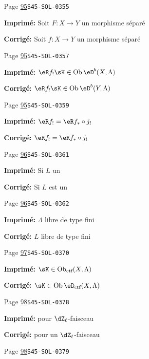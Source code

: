 \documentclass[oneside]{book}
\DeclareMathOperator{\ob}{Ob}
\theoremstyle{sga-source}
\theoremstyle{sga-source-dash}
\theoremstyle{sga-source-dotdash}
\theoremstyle{sga-source-number-note-dash}
\theoremstyle{sga-source-note-number-dotdash}
\theoremstyle{sga-source-example-dotdash}
\theoremstyle{sga-source-inline-number}
\theoremstyle{sga-source-bare-number}
\theoremstyle{sga-source}
\begin{document}
\begin{description}
\smallskip
\item[\hypertarget{apparatus:FR-0047}{47}] Page \hyperlink{printpage:fr:95}{95}\quad\texttt{S45-SOL-0355}
\par\noindent\textbf{Imprimé:} Soit $F:X\to Y$ un morphisme séparé
\par\noindent\textbf{Corrigé:} Soit $f:X\to Y$ un morphisme séparé
\smallskip
\item[\hypertarget{apparatus:FR-0048}{48}] Page \hyperlink{printpage:fr:95}{95}\quad\texttt{S45-SOL-0357}
\par\noindent\textbf{Imprimé:} $\eR f_!\sK\in \ob \eD^b(X,\Lambda)$
\par\noindent\textbf{Corrigé:} $\eR f_!\sK\in \ob \eD^b(Y,\Lambda)$
\smallskip
\item[\hypertarget{apparatus:FR-0049}{49}] Page \hyperlink{printpage:fr:95}{95}\quad\texttt{S45-SOL-0359}
\par\noindent\textbf{Imprimé:} $\eR f_! = \eR f_*\circ j_!$
\par\noindent\textbf{Corrigé:} $\eR f_! = \eR \bar f_*\circ j_!$
\smallskip
\item[\hypertarget{apparatus:FR-0050}{50}] Page \hyperlink{printpage:fr:96}{96}\quad\texttt{S45-SOL-0361}
\par\noindent\textbf{Imprimé:} Si $L$ un
\par\noindent\textbf{Corrigé:} Si $L$ est un
\smallskip
\item[\hypertarget{apparatus:FR-0051}{51}] Page \hyperlink{printpage:fr:96}{96}\quad\texttt{S45-SOL-0362}
\par\noindent\textbf{Imprimé:} $\Lambda$ libre de type fini
\par\noindent\textbf{Corrigé:} $L$ libre de type fini
\smallskip
\item[\hypertarget{apparatus:FR-0052}{52}] Page \hyperlink{printpage:fr:97}{97}\quad\texttt{S45-SOL-0370}
\par\noindent\textbf{Imprimé:} \(\sK\in\ob_{\text{ctf}}(X,\Lambda)\)
\par\noindent\textbf{Corrigé:} \(\sK\in\ob\eD_\text{ctf}(X,\Lambda)\)
\smallskip
\item[\hypertarget{apparatus:FR-0053}{53}] Page \hyperlink{printpage:fr:98}{98}\quad\texttt{S45-SOL-0378}
\par\noindent\textbf{Imprimé:} pour 
$\dZ_\ell$-faisceau
\par\noindent\textbf{Corrigé:} pour un 
$\dZ_\ell$-faisceau
\smallskip
\item[\hypertarget{apparatus:FR-0054}{54}] Page \hyperlink{printpage:fr:98}{98}\quad\texttt{S45-SOL-0379}

\end{description}
\end{document}
